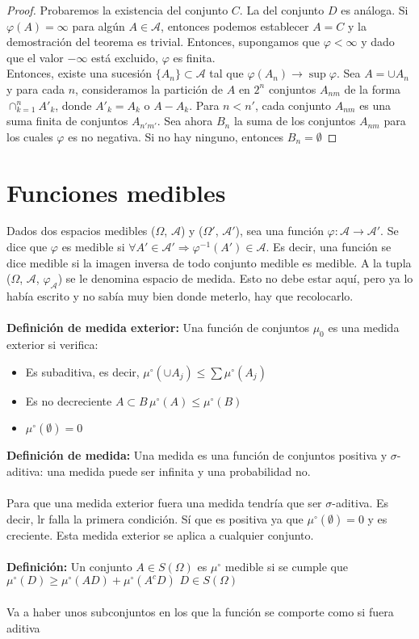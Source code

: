 \documentclass[12pt,a4paper]{book}
\begin{document}
\begin{proof}
Probaremos la existencia del conjunto $C$. La del conjunto $D$ es análoga. Si $\varphi(A) = \infty$ para algún $A \in \mathcal{A}$, entonces podemos establecer $A = C$ y la demostración del teorema es trivial. Entonces, supongamos que $\varphi < \infty$ y dado que el valor $-\infty$ está excluido, $\varphi$ es finita.\\

Entonces, existe una sucesión $\{A_n\} \subset \mathcal{A}$ tal que $\varphi(A_n) \to \sup \varphi$. Sea $A = \cup A_n $ y para cada $n$, consideramos la partición de $A$ en $2^n$ conjuntos $A_{nm}$ de la forma $\displaystyle \cap_{k=1}^n A'_k$, donde $A'_k = A_k$ o $A - A_k$. Para $n < n'$, cada conjunto $A_{nm}$ es una suma finita de conjuntos $A_{n'm'}$. Sea ahora $B_n$ la suma de los conjuntos $A_{nm}$ para los cuales $\varphi$ es no negativa. Si no hay ninguno, entonces $B_n = \emptyset$
\end{proof}

\section{Funciones medibles}

Dados dos espacios medibles ($\Omega$, $\mathcal{A}$) y ($\Omega'$, $\mathcal{A}'$), sea una función $\varphi : \mathcal{A} \rightarrow \mathcal{A}'$. Se dice que $\varphi$ es medible si $\forall A' \in \mathcal{A}' \Rightarrow \varphi^{-1}(A') \in \mathcal{A}$. Es decir, una función se dice medible si la imagen inversa de todo conjunto medible es medible. A la tupla ($\Omega$, $\mathcal{A}$, $\varphi_{\mathcal{A}}$) se le denomina espacio de medida. Esto no debe estar aquí, pero ya lo había escrito y no sabía muy bien donde meterlo, hay que recolocarlo.
\\\\
\textbf{Definición de medida exterior:} Una función de conjuntos $\mu_0$ es una medida exterior si verifica:
\begin{itemize}
\item Es subaditiva, es decir,  $\mu^\circ (\cup A_j)\leq \displaystyle \sum \mu^\circ (A_j)$
\item Es no decreciente $A\subset B \, \mu^\circ(A)\leq \mu^\circ(B)$
\item $\mu^\circ(\emptyset)=0$
\end{itemize}
\textbf{Definición de medida:} Una medida es una función de conjuntos positiva y $\sigma$-aditiva: una medida puede ser infinita y una probabilidad no.
\\\\
Para que una medida exterior fuera una medida tendría que ser $\sigma$-aditiva. Es decir, lr falla la primera condición. Sí que es positiva ya que $\mu^\circ(\emptyset)=0$ y es creciente. Esta medida exterior se aplica a cualquier conjunto.
\\\\
\textbf{Definición:} Un conjunto $A\in S(\Omega)$ es $\mu^\circ$ medible si se cumple que $\mu^\circ(D)\geq\mu^\circ(AD)+\mu^\circ(A^cD)\,\, D \in S(\Omega)$
\\\\
Va a haber unos subconjuntos en los que la función se comporte como si fuera aditiva
\end{document}
